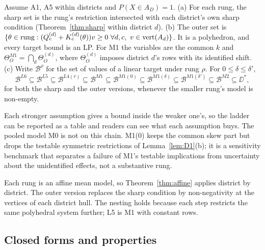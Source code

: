 \begin{theorem}\label{thm:ladder}
Assume A1, A5 within districts and $P(X\in A_D)=1$.
(a) For each rung, the sharp set is the rung's restriction intersected with each
district's own sharp condition (Theorem~\ref{thm:sharp} within district $d$).
(b) The outer set is
$\{\theta\in\text{rung}:(Q^{(d)}_c+K^{(d)}_c(\theta))v\ge0\ \forall d,c,\ v\in\vertx(A_d)\}$.
It is a polyhedron, and every target bound is an LP. For M1 the variables are the
common $k$ and $\Theta^{M1}_O=\bigcap_d\Theta^{(d)}_O$, where $\Theta^{(d)}_O$
imposes district $d$'s rows with its identified shift.
(c) Write $\mathcal B^\rho$ for the set of values of a linear target under rung
$\rho$. For $0\le\delta\le\delta'$,
\[
\mathcal B^{L6}\subseteq\mathcal B^{L5}\subseteq\mathcal B^{L4(r)}\subseteq\mathcal B^{M1}\subseteq\mathcal B^{M1(0)}\subseteq\mathcal B^{M1(\delta)}\subseteq\mathcal B^{M1(\delta')}\subseteq\mathcal B^{M2}\subseteq\DD^*,
\]
for both the sharp and the outer versions, whenever the smaller rung's model is
non-empty.
\end{theorem}
\begin{reading}
Each stronger assumption gives a bound inside the weaker one's, so the ladder can
be reported as a table and readers can see what each assumption buys. The pooled
model M0 is not on this chain. M1(0) keeps the common skew part but drops the
testable symmetric restrictions of Lemma~\ref{lem:D1}(b); it is a sensitivity
benchmark that separates a failure of M1's testable implications from
uncertainty about the unidentified effects, not a substantive rung.
\end{reading}
\begin{sketch}
Each rung is an affine mean model, so Theorem~\ref{thm:affine} applies district
by district. The outer version replaces the sharp condition by non-negativity at
the vertices of each district hull. The nesting holds because each step restricts
the same polyhedral system further; L5 is M1 with constant rows.
\end{sketch}

\subsection{Closed forms and properties}

